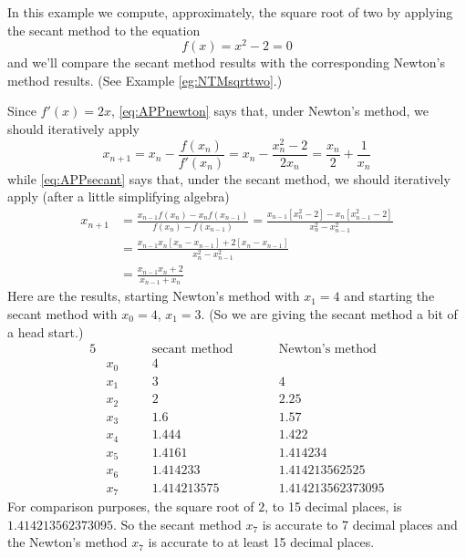 \begin{eg}\label{eg:NTMsqrttwoC}
In this example we compute, approximately, the square root of two by
applying the secant method to the equation
\begin{equation*}
f(x)=x^2-2=0
\end{equation*}
and we'll compare the secant method results with the corresponding Newton's method results.
(See Example \ref{eg:NTMsqrttwo}.)

Since $f'(x)=2x$, \eqref{eq:APPnewton} says that, under Newton's method, 
we should iteratively apply
\begin{equation*}
x_{n+1}=x_n-\frac{f(x_n)}{f'(x_n)}=x_n-\frac{x_n^2-2}{2x_n}
=\frac{x_n}{2} +\frac{1}{x_n}
\end{equation*}
while \eqref{eq:APPsecant} says that, under the secant method, 
we should iteratively apply (after a little simplifying algebra)
\begin{align*}
x_{n+1}&=\frac{x_{n-1} f(x_n) - x_n f(x_{n-1}) }{f(x_n)-f(x_{n-1})}
       =\frac{x_{n-1}[x_n^2-2] - x_n[x_{n-1}^2-2] }{x_n^2-x_{n-1}^2} \\
       &=\frac{x_{n-1}x_n[x_n-x_{n-1}]+2[x_n-x_{n-1}]}{x_n^2-x_{n-1}^2} \\
       &=\frac{x_{n-1}x_n+2}{x_{n-1}+x_n}
\end{align*}
Here are the results, starting Newton's method with $x_1=4$ and starting
the secant method with $x_0=4$, $x_1=3$. (So we are giving the secant method 
a bit of a head start.)
\begin{alignat*}{5}
&  &&\text{secant method}\qquad &&\text{Newton's method} \\
&x_0\quad && 4 && \\
&x_1 && 3 && 4 \\
&x_2 && 2 && 2.25 \\
&x_3 && 1.6 && 1.57 \\
&x_4 && 1.444 && 1.422 \\
&x_5 && 1.4161 && 1.414234 \\
&x_6 && 1.414233 && 1.414213562525 \\
&x_7 && 1.414213575 && 1.414213562373095
\end{alignat*}
For comparison purposes, the square root of $2$, to 15 decimal places,
is $1.414213562373095$. %
So the secant method $x_7$ is accurate to 7 decimal places 
and the Newton's method $x_7$ is accurate to at least 15 decimal places.



\end{eg}


